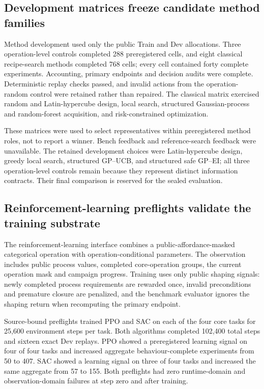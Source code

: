 \documentclass[11pt]{article}
\begin{document}
\subsection*{Development matrices freeze candidate method families}

Method development used only the public Train and Dev allocations. Three operation-level controls completed 288 preregistered cells, and eight classical recipe-search methods completed 768 cells; every cell contained forty complete experiments. Accounting, primary endpoints and decision audits were complete. Deterministic replay checks passed, and invalid actions from the operation-random control were retained rather than repaired. The classical matrix exercised random and Latin-hypercube design, local search, structured Gaussian-process and random-forest acquisition, and risk-constrained optimization.

These matrices were used to select representatives within preregistered method roles, not to report a winner. Bench feedback and reference-search feedback were unavailable. The retained development choices were Latin-hypercube design, greedy local search, structured GP--UCB, and structured safe GP--EI; all three operation-level controls remain because they represent distinct information contracts. Their final comparison is reserved for the sealed evaluation.

\subsection*{Reinforcement-learning preflights validate the training substrate}

The reinforcement-learning interface combines a public-affordance-masked categorical operation with operation-conditional parameters. The observation includes public process values, completed core-operation groups, the current operation mask and campaign progress. Training uses only public shaping signals: newly completed process requirements are rewarded once, invalid preconditions and premature closure are penalized, and the benchmark evaluator ignores the shaping return when recomputing the primary endpoint.

Source-bound preflights trained PPO and SAC on each of the four core tasks for 25,600 environment steps per task. Both algorithms completed 102,400 total steps and sixteen exact Dev replays. PPO showed a preregistered learning signal on four of four tasks and increased aggregate behaviour-complete experiments from 50 to 407. SAC showed a learning signal on three of four tasks and increased the same aggregate from 57 to 155. Both preflights had zero runtime-domain and observation-domain failures at step zero and after training.
\end{document}
